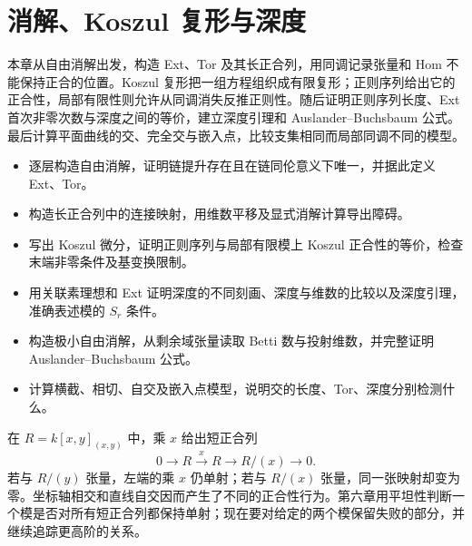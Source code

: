 
% 
% 

\chapter{消解、Koszul 复形与深度}
\label{g5:ch:08}

\begin{chapterabstract}
	本章从自由消解出发，构造 Ext、Tor 及其长正合列，用同调记录张量和 Hom 不能保持正合的位置。Koszul 复形把一组方程组织成有限复形；正则序列给出它的正合性，局部有限性则允许从同调消失反推正则性。随后证明正则序列长度、Ext 首次非零次数与深度之间的等价，建立深度引理和 Auslander–Buchsbaum 公式。最后计算平面曲线的交、完全交与嵌入点，比较支集相同而局部同调不同的模型。
\end{chapterabstract}

\begin{learninggoals}
	\begin{itemize}
		\item 逐层构造自由消解，证明链提升存在且在链同伦意义下唯一，并据此定义 Ext、Tor。
		\item 构造长正合列中的连接映射，用维数平移及显式消解计算导出障碍。
		\item 写出 Koszul 微分，证明正则序列与局部有限模上 Koszul 正合性的等价，检查末端非零条件及基变换限制。
		\item 用关联素理想和 Ext 证明深度的不同刻画、深度与维数的比较以及深度引理，准确表述模的 \(S_r\) 条件。
		\item 构造极小自由消解，从剩余域张量读取 Betti 数与投射维数，并完整证明 Auslander–Buchsbaum 公式。
		\item 计算横截、相切、自交及嵌入点模型，说明交的长度、Tor、深度分别检测什么。
	\end{itemize}
\end{learninggoals}

在 \(R=k[x,y]_{(x,y)}\) 中，乘 \(x\) 给出短正合列
\[
	0\longrightarrow R\xrightarrow{x}R\longrightarrow R/(x)\longrightarrow0.
\]
若与 \(R/(y)\) 张量，左端的乘 \(x\) 仍单射；若与 \(R/(x)\) 张量，同一张映射却变为零。坐标轴相交和直线自交因而产生了不同的正合性行为。第六章用平坦性判断一个模是否对所有短正合列都保持单射；现在要对给定的两个模保留失败的部分，并继续追踪更高阶的关系。

